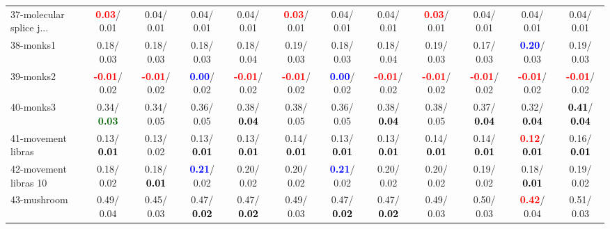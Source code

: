 \begin{table}[h]
\begin{center}
{\begin{tabular}{lc|c|c|c|c|c|c|c|c|c|c}
37-molecular splice j... & \textcolor{red}{\textbf{  0.03}}/  0.01 &   0.04/  0.01 &   0.04/  0.01 &   0.04/  0.01 & \textcolor{red}{\textbf{  0.03}}/  0.01 &   0.04/  0.01 &   0.04/  0.01 & \textcolor{red}{\textbf{  0.03}}/  0.01 &   0.04/  0.01 &   0.04/  0.01 &   0.04/  0.01 \\
38-monks1 &   0.18/  0.03 &   0.18/  0.03 &   0.18/  0.03 &   0.18/  0.04 &   0.19/  0.03 &   0.18/  0.03 &   0.18/  0.04 &   0.19/  0.03 &   0.17/  0.03 & \textcolor{blue}{\textbf{  0.20}}/  0.03 &   0.19/  0.03 \\
39-monks2 & \textcolor{red}{\textbf{ -0.01}}/  0.02 & \textcolor{red}{\textbf{ -0.01}}/  0.02 & \textcolor{blue}{\textbf{  0.00}}/  0.02 & \textcolor{red}{\textbf{ -0.01}}/  0.02 & \textcolor{red}{\textbf{ -0.01}}/  0.02 & \textcolor{blue}{\textbf{  0.00}}/  0.02 & \textcolor{red}{\textbf{ -0.01}}/  0.02 & \textcolor{red}{\textbf{ -0.01}}/  0.02 & \textcolor{red}{\textbf{ -0.01}}/  0.02 & \textcolor{red}{\textbf{ -0.01}}/  0.02 & \textcolor{red}{\textbf{ -0.01}}/  0.02 \\ \hline
40-monks3 &   0.34/\textcolor{darkgreen}{\textbf{  0.03}} &   0.34/  0.05 &   0.36/  0.05 &   0.38/\textcolor{black}{\textbf{  0.04}} &   0.38/  0.05 &   0.36/  0.05 &   0.38/\textcolor{black}{\textbf{  0.04}} &   0.38/  0.05 &   0.37/\textcolor{black}{\textbf{  0.04}} &   0.32/\textcolor{black}{\textbf{  0.04}} & \textcolor{black}{\textbf{  0.41}}/\textcolor{black}{\textbf{  0.04}} \\
41-movement libras &   0.13/\textcolor{black}{\textbf{  0.01}} &   0.13/  0.02 &   0.13/\textcolor{black}{\textbf{  0.01}} &   0.13/\textcolor{black}{\textbf{  0.01}} &   0.14/\textcolor{black}{\textbf{  0.01}} &   0.13/\textcolor{black}{\textbf{  0.01}} &   0.13/\textcolor{black}{\textbf{  0.01}} &   0.14/\textcolor{black}{\textbf{  0.01}} &   0.14/\textcolor{black}{\textbf{  0.01}} & \textcolor{red}{\textbf{  0.12}}/\textcolor{black}{\textbf{  0.01}} &   0.16/\textcolor{black}{\textbf{  0.01}} \\
42-movement libras 10 &   0.18/  0.02 &   0.18/\textcolor{black}{\textbf{  0.01}} & \textcolor{blue}{\textbf{  0.21}}/  0.02 &   0.20/  0.02 &   0.20/  0.02 & \textcolor{blue}{\textbf{  0.21}}/  0.02 &   0.20/  0.02 &   0.20/  0.02 &   0.19/  0.02 &   0.18/\textcolor{black}{\textbf{  0.01}} &   0.19/  0.02 \\
43-mushroom &   0.49/  0.04 &   0.45/  0.03 &   0.47/\textcolor{black}{\textbf{  0.02}} &   0.47/\textcolor{black}{\textbf{  0.02}} &   0.49/  0.03 &   0.47/\textcolor{black}{\textbf{  0.02}} &   0.47/\textcolor{black}{\textbf{  0.02}} &   0.49/  0.03 &   0.50/  0.03 & \textcolor{red}{\textbf{  0.42}}/  0.04 &   0.51/  0.03 \\

\end{tabular}}
\end{center}
\end{table}
